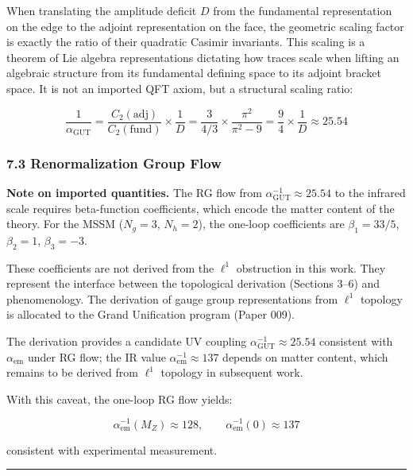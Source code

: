 \documentclass[
]{article}
\begin{document}
When translating the amplitude deficit \(D\) from the fundamental
representation on the edge to the adjoint representation on the face,
the geometric scaling factor is exactly the ratio of their quadratic
Casimir invariants. This scaling is a theorem of Lie algebra
representations dictating how traces scale when lifting an algebraic
structure from its fundamental defining space to its adjoint bracket
space. It is not an imported QFT axiom, but a structural scaling ratio:

\[\frac{1}{\alpha_{\mathrm{GUT}}} = \frac{C_2(\mathrm{adj})}{C_2(\mathrm{fund})} \times \frac{1}{D} = \frac{3}{4/3} \times \frac{\pi^2}{\pi^2 - 9} = \frac{9}{4} \times \frac{1}{D} \approx 25.54\]

\hypertarget{renormalization-group-flow}{%
\subsubsection{7.3 Renormalization Group
Flow}\label{renormalization-group-flow}}

\textbf{Note on imported quantities.} The RG flow from
\(\alpha_{\mathrm{GUT}}^{-1} \approx 25.54\) to the infrared scale
requires beta-function coefficients, which encode the matter content of
the theory. For the MSSM (\(N_g = 3\), \(N_h = 2\)), the one-loop
coefficients are \(\beta_1 = 33/5\), \(\beta_2 = 1\), \(\beta_3 = -3\).

These coefficients are not derived from the \(\ell^1\) obstruction in
this work. They represent the interface between the topological
derivation (Sections 3--6) and phenomenology. The derivation of gauge
group representations from \(\ell^1\) topology is allocated to the Grand
Unification program (Paper 009).

The derivation provides a candidate UV coupling
\(\alpha_{\mathrm{GUT}}^{-1} \approx 25.54\) consistent with
\(\alpha_{\mathrm{em}}\) under RG flow; the IR value
\(\alpha_{\mathrm{em}}^{-1} \approx 137\) depends on matter content,
which remains to be derived from \(\ell^1\) topology in subsequent work.

With this caveat, the one-loop RG flow yields:

\[\alpha_{\mathrm{em}}^{-1}(M_Z) \approx 128, \qquad \alpha_{\mathrm{em}}^{-1}(0) \approx 137\]

consistent with experimental measurement.

\begin{center}\rule{0.5\linewidth}{0.5pt}\end{center}
\end{document}
